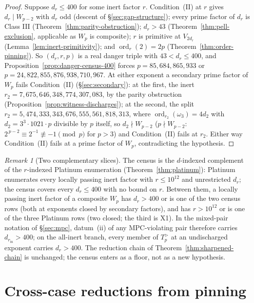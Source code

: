 \documentclass[11pt]{amsart}
\theoremstyle{plain}
\theoremstyle{definition}
\theoremstyle{remark}
\newtheorem{remark}[theorem]{Remark}
\numberwithin{equation}{section}
\newcommand{\ord}{\operatorname{ord}}
\begin{document}
\begin{proof}
Suppose $d_r \leq 400$ for some inert factor $r$. Condition~(II) at $r$ gives $d_r \mid W_{p-2}$ with $d_r$ odd (descent of \S\ref{sec:gap-structure}); every prime factor of $d_r$ is Class III (Theorem~\ref{thm:parity-obstruction}); $d_r > 43$ (Theorem~\ref{thm:pell-exclusion}, applicable as $W_p$ is composite); $r$ is primitive at $V_{2 d_r}$ (Lemma~\ref{lem:inert-primitivity}); and $\ord_r(2) = 2 p$ (Theorem~\ref{thm:order-pinning}). So $(d_r, r, p)$ is a real danger triple with $43 < d_r \leq 400$, and Proposition~\ref{prop:danger-census-400} forces $p = 85{,}684{,}865{,}933$ or $p = 24{,}822{,}855{,}876{,}938{,}710{,}967$. At either exponent a secondary prime factor of $W_p$ fails Condition~(II) (\S\ref{sec:secondary}): at the first, the inert $r_2 = 7{,}675{,}646{,}348{,}774{,}307{,}083$, by the parity obstruction (Proposition~\ref{prop:witness-discharges}); at the second, the split $r_2 = 5{,}474{,}333{,}343{,}676{,}555{,}561{,}818{,}313$, where $\ord_{r_2}(\omega_3) = 4 d_2$ with $d_2 = 3^3 \cdot 1021 \cdot p$ divisible by $p$ itself, so $d_2 \nmid W_{p-2}$ ($p \nmid W_{p-2}$: $2^{\,p-2} \equiv 2^{-1} \not\equiv -1 \pmod p$ for $p > 3$) and Condition~(II) fails at $r_2$. Either way Condition~(II) fails at a prime factor of $W_p$, contradicting the hypothesis.
\end{proof}

\begin{remark}[Two complementary slices]\label{rem:two-slices}
The census is the $d$-indexed complement of the $r$-indexed Platinum enumeration (Theorem~\ref{thm:platinum}): Platinum enumerates every locally passing inert factor with $r \leq 10^{12}$ and unrestricted $d_r$; the census covers every $d_r \leq 400$ with no bound on $r$. Between them, a locally passing inert factor of a composite $W_p$ has $d_r > 400$ or is one of the two census rows (both at exponents closed by secondary factors), and has $r > 10^{12}$ or is one of the three Platinum rows (two closed; the third is X1). In the mixed-pair notation of \S\ref{sec:mpc}, datum~(ii) of any MPC-violating pair therefore carries $d_{r_{\mathrm{in}}} > 400$; on the all-inert branch, every member of $T_p^{>}$ at an undischarged exponent carries $d_r > 400$. The reduction chain of Theorem~\ref{thm:sharpened-chain} is unchanged; the census enters as a floor, not as a new hypothesis.
\end{remark}

\section{Cross-case reductions from pinning}\label{sec:cross-case}
\end{document}
